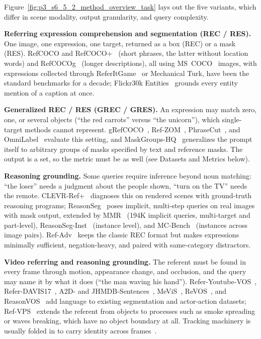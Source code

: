 Figure~\ref{fig:p3_s6_5_2_method_overview_task} lays out the five variants, which differ in scene modality, output granularity, and query complexity.

\textbf{Referring expression comprehension and segmentation (REC / RES).} One image, one expression, one target, returned as a box (REC) or a mask (RES). RefCOCO and RefCOCO+~\cite{yu2016modeling} (short phrases, the latter without location words) and RefCOCOg~\cite{mao2016generation} (longer descriptions), all using MS~COCO~\cite{lin2014microsoft} images, with expressions collected through ReferItGame~\cite{kazemzadeh2014referitgame} or Mechanical Turk, have been the standard benchmarks for a decade; Flickr30k Entities~\cite{plummer2015flickr30k,young2014image} grounds every entity mention of a caption at once.

\textbf{Generalized REC / RES (GREC / GRES).} An expression may match zero, one, or several objects (``the red carrots'' versus ``the unicorn''), which single-target methods cannot represent. gRefCOCO~\cite{liu2023gres}, Ref-ZOM~\cite{hu2023beyond}, PhraseCut~\cite{wu2020phrasecut}, and OmniLabel~\cite{schulter2023omnilabel} evaluate this setting, and MaskGroups-HQ~\cite{cao2025refer} generalizes the prompt itself to arbitrary groups of masks specified by text and reference masks. The output is a set, so the metric must be as well (see Datasets and Metrics below).

\textbf{Reasoning grounding.} Some queries require inference beyond noun matching: ``the loser'' needs a judgment about the people shown, ``turn on the TV'' needs the remote. CLEVR-Ref+~\cite{liu2019clevr} diagnoses this on rendered scenes with ground-truth reasoning programs; ReasonSeg~\cite{lai2024lisa} poses implicit, multi-step queries on real images with mask output, extended by MMR~\cite{jang2025mmr} (194K implicit queries, multi-target and part-level), ReasonSeg-Inst~\cite{yang2023lisa++} (instance level), and MC-Bench~\cite{xu2024mcbench} (instances across image pairs). Ref-Adv~\cite{dong2026ref} keeps the classic REC format but makes expressions minimally sufficient, negation-heavy, and paired with same-category distractors.

\textbf{Video referring and reasoning grounding.} The referent must be found in every frame through motion, appearance change, and occlusion, and the query may name it by what it does (``the man waving his hand''). Refer-Youtube-VOS~\cite{seo2020urvos}, Refer-DAVIS17~\cite{khoreva2018video}, A2D- and JHMDB-Sentences~\cite{gavrilyuk2018actor}, MeViS~\cite{ding2023mevis}, ReVOS~\cite{yan2024visa}, and ReasonVOS~\cite{bai2024one} add language to existing segmentation and actor-action datasets; Ref-VPS~\cite{bagchi2025refereverything} extends the referent from objects to processes such as smoke spreading or waves breaking, which have no object boundary at all. Tracking machinery is usually folded in to carry identity across frames~\cite{fang2025decoupled}.

